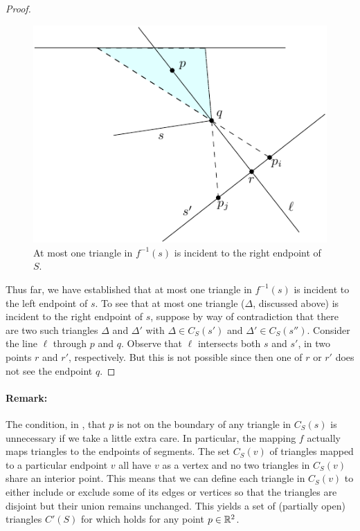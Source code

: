 \documentclass{patmorin}
\begin{document}
\begin{proof}
\begin{figure}
  \begin{center}
    \includegraphics{count-right}
  \end{center}
  \caption{At most one triangle in $f^{-1}(s)$ is incident to the right
           endpoint of $S$.}
\end{figure}

Thus far, we have established that at most one triangle in $f^{-1}(s)$ is
incident to the left endpoint of $s$.  To see that at most one triangle
($\Delta$, discussed above) is incident to the right endpoint of $s$,
suppose by way of contradiction that there are two such triangles $\Delta$
and $\Delta'$ with $\Delta\in C_S(s')$ and $\Delta'\in C_S(s'')$.
Consider the line $\ell$ through $p$ and $q$.  Observe that $\ell$
intersects both $s$ and $s'$, in two points $r$ and $r'$, respectively. But
this is not possible since then one of $r$ or $r'$ does not see the
endpoint $q$.
\end{proof}

\paragraph{Remark:}
The condition, in , that $p$ is not on the boundary of
any triangle in $C_S(s)$ is unnecessary if we take a little extra care.
In particular, the mapping $f$ actually maps triangles to the endpoints of
segments.  The set $C_S(v)$ of triangles mapped to a particular endpoint
$v$ all have $v$ as a vertex and no two triangles in $C_S(v)$ share an
interior point.  This means that we can define each triangle in $C_S(v)$
to either include or exclude some of its edges or vertices so that the
triangles are disjoint but their union remains unchanged. This yields
a set of (partially open) triangles $C'(S)$ for which 
holds for any point $p\in\mathbb{R}^2$.
\end{document}
